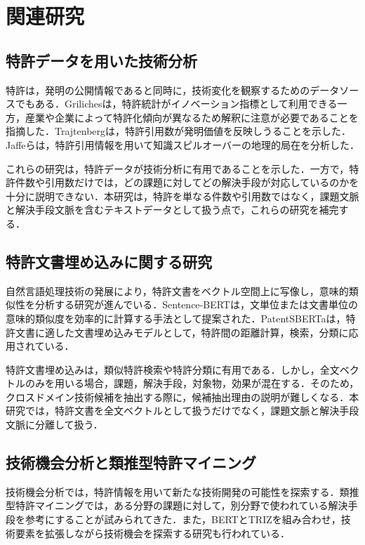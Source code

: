 \chapter{関連研究}

\section{特許データを用いた技術分析}
特許は，発明の公開情報であると同時に，技術変化を観察するためのデータソースでもある．Grilichesは，特許統計がイノベーション指標として利用できる一方，産業や企業によって特許化傾向が異なるため解釈に注意が必要であることを指摘した\cite{griliches1990patent}．Trajtenbergは，特許引用数が発明価値を反映しうることを示した\cite{trajtenberg1990penny}．Jaffeらは，特許引用情報を用いて知識スピルオーバーの地理的局在を分析した\cite{jaffe1993geographic}．

これらの研究は，特許データが技術分析に有用であることを示した．一方で，特許件数や引用数だけでは，どの課題に対してどの解決手段が対応しているのかを十分に説明できない．本研究は，特許を単なる件数や引用数ではなく，課題文脈と解決手段文脈を含むテキストデータとして扱う点で，これらの研究を補完する．

\section{特許文書埋め込みに関する研究}
自然言語処理技術の発展により，特許文書をベクトル空間上に写像し，意味的類似性を分析する研究が進んでいる．Sentence-BERTは，文単位または文書単位の意味的類似度を効率的に計算する手法として提案された\cite{reimers2019sentencebert}．PatentSBERTaは，特許文書に適した文書埋め込みモデルとして，特許間の距離計算，検索，分類に応用されている\cite{bekamiri2021patentsberta}．

特許文書埋め込みは，類似特許検索や特許分類に有用である．しかし，全文ベクトルのみを用いる場合，課題，解決手段，対象物，効果が混在する．そのため，クロスドメイン技術候補を抽出する際に，候補抽出理由の説明が難しくなる．本研究では，特許文書を全文ベクトルとして扱うだけでなく，課題文脈と解決手段文脈に分離して扱う．

\section{技術機会分析と類推型特許マイニング}
技術機会分析では，特許情報を用いて新たな技術開発の可能性を探索する．類推型特許マイニングでは，ある分野の課題に対して，別分野で使われている解決手段を参考にすることが試みられてきた\cite{jeong2014analogy}．また，BERTとTRIZを組み合わせ，技術要素を拡張しながら技術機会を探索する研究も行われている\cite{wang2023berttriz}．

